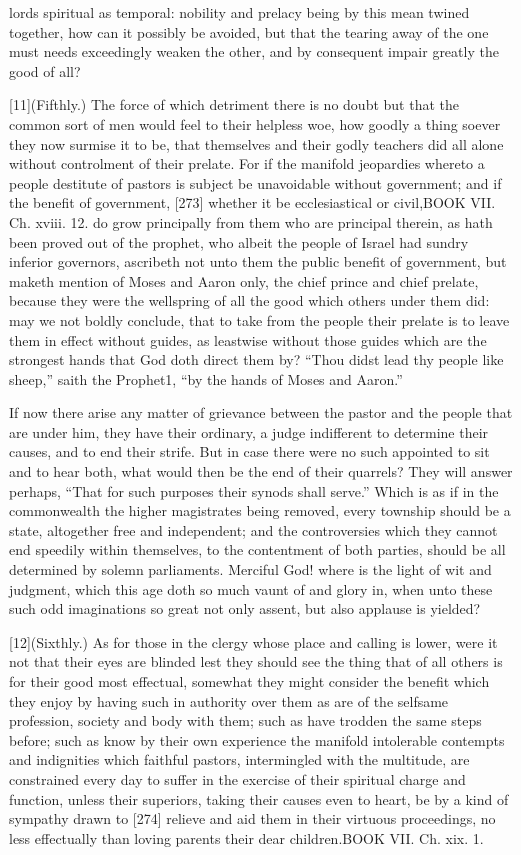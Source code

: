 lords spiritual as temporal: nobility and prelacy being by this mean twined together, how can it possibly be avoided, but that the tearing away of the one must needs exceedingly weaken the other, and by consequent impair greatly the good of all?

[11](Fifthly.) The force of which detriment there is no doubt but that the common sort of men would feel to their helpless woe, how goodly a thing soever they now surmise it to be, that themselves and their godly teachers did all alone without controlment of their prelate. For if the manifold jeopardies whereto a people destitute of pastors is subject be unavoidable without government; and if the benefit of government, [273] whether it be ecclesiastical or civil,BOOK VII. Ch. xviii. 12. do grow principally from them who are principal therein, as hath been proved out of the prophet, who albeit the people of Israel had sundry inferior governors, ascribeth not unto them the public benefit of government, but maketh mention of Moses and Aaron only, the chief prince and chief prelate, because they were the wellspring of all the good which others under them did: may we not boldly conclude, that to take from the people their prelate is to leave them in effect without guides, as leastwise without those guides which are the strongest hands that God doth direct them by? “Thou didst lead thy people like sheep,” saith the Prophet1, “by the hands of Moses and Aaron.”

If now there arise any matter of grievance between the pastor and the people that are under him, they have their ordinary, a judge indifferent to determine their causes, and to end their strife. But in case there were no such appointed to sit and to hear both, what would then be the end of their quarrels? They will answer perhaps, “That for such purposes their synods shall serve.” Which is as if in the commonwealth the higher magistrates being removed, every township should be a state, altogether free and independent; and the controversies which they cannot end speedily within themselves, to the contentment of both parties, should be all determined by solemn parliaments. Merciful God! where is the light of wit and judgment, which this age doth so much vaunt of and glory in, when unto these such odd imaginations so great not only assent, but also applause is yielded?

[12](Sixthly.) As for those in the clergy whose place and calling is lower, were it not that their eyes are blinded lest they should see the thing that of all others is for their good most effectual, somewhat they might consider the benefit which they enjoy by having such in authority over them as are of the selfsame profession, society and body with them; such as have trodden the same steps before; such as know by their own experience the manifold intolerable contempts and indignities which faithful pastors, intermingled with the multitude, are constrained every day to suffer in the exercise of their spiritual charge and function, unless their superiors, taking their causes even to heart, be by a kind of sympathy drawn to [274] relieve and aid them in their virtuous proceedings, no less effectually than loving parents their dear children.BOOK VII. Ch. xix. 1.

